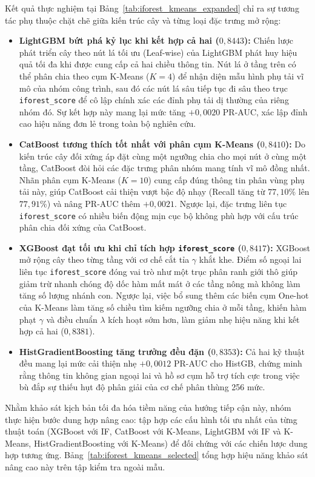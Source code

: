 Kết quả thực nghiệm tại Bảng~\ref{tab:iforest_kmeans_expanded} chỉ ra sự tương tác phụ thuộc chặt chẽ giữa kiến trúc cây và từng loại đặc trưng mở rộng:
\begin{itemize}
    \item \textbf{LightGBM bứt phá kỷ lục khi kết hợp cả hai ($0{,}8443$):} Chiến lược phát triển cây theo nút lá tối ưu (Leaf-wise) của LightGBM phát huy hiệu quả tối đa khi được cung cấp cả hai chiều thông tin. Nút lá ở tầng trên có thể phân chia theo cụm K-Means ($K=4$) để nhận diện mẫu hình phụ tải vĩ mô của nhóm công trình, sau đó các nút lá sâu tiếp tục đi sâu theo trục \texttt{iforest\_score} để cô lập chính xác các đỉnh phụ tải dị thường của riêng nhóm đó. Sự kết hợp này mang lại mức tăng $+0{,}0020$ PR-AUC, xác lập đỉnh cao hiệu năng đơn lẻ trong toàn bộ nghiên cứu.
    \item \textbf{CatBoost tương thích tốt nhất với phân cụm K-Means ($0{,}8410$):} Do kiến trúc cây đối xứng áp đặt cùng một ngưỡng chia cho mọi nút ở cùng một tầng, CatBoost đòi hỏi các đặc trưng phân nhóm mang tính vĩ mô đồng nhất. Nhãn phân cụm K-Means ($K=10$) cung cấp đúng thông tin phân vùng phụ tải này, giúp CatBoost cải thiện vượt bậc độ nhạy (Recall tăng từ $77{,}10\%$ lên $77{,}91\%$) và nâng PR-AUC thêm $+0{,}0021$. Ngược lại, đặc trưng liên tục \texttt{iforest\_score} có nhiều biến động mịn cục bộ không phù hợp với cấu trúc phân chia đối xứng của CatBoost.
    \item \textbf{XGBoost đạt tối ưu khi chỉ tích hợp \texttt{iforest\_score} ($0{,}8417$):} XGBoost mở rộng cây theo từng tầng với cơ chế cắt tỉa $\gamma$ khắt khe. Điểm số ngoại lai liên tục \texttt{iforest\_score} đóng vai trò như một trục phân ranh giới thô giúp giảm trừ nhanh chóng độ dốc hàm mất mát ở các tầng nông mà không làm tăng số lượng nhánh con. Ngược lại, việc bổ sung thêm các biến cụm One-hot của K-Means làm tăng số chiều tìm kiếm ngưỡng chia ở mỗi tầng, khiến hàm phạt $\gamma$ và điều chuẩn $\lambda$ kích hoạt sớm hơn, làm giảm nhẹ hiệu năng khi kết hợp cả hai ($0{,}8381$).
    \item \textbf{HistGradientBoosting tăng trưởng đều đặn ($0{,}8353$):} Cả hai kỹ thuật đều mang lại mức cải thiện nhẹ $+0{,}0012$ PR-AUC cho HistGB, chứng minh rằng thông tin không gian ngoại lai và hồ sơ cụm hỗ trợ tích cực trong việc bù đắp sự thiếu hụt độ phân giải của cơ chế phân thùng 256 mức.
\end{itemize}

Nhằm khảo sát kịch bản tối đa hóa tiềm năng của hướng tiếp cận này, nhóm thực hiện bước dung hợp nâng cao: tập hợp các cấu hình tối ưu nhất của từng thuật toán (XGBoost với IF, CatBoost với K-Means, LightGBM với IF và K-Means, HistGradientBoosting với K-Means) để đối chứng với các chiến lược dung hợp tương ứng. Bảng~\ref{tab:iforest_kmeans_selected} tổng hợp hiệu năng khảo sát nâng cao này trên tập kiểm tra ngoài mẫu.

